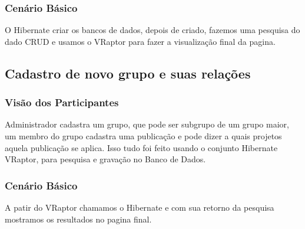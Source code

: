\documentclass[11pt, a4paper]{article}
\begin{document}
	        \subsubsection{Cenário Básico}
                O Hibernate criar os bancos de dados, depois de criado, fazemos uma pesquisa do dado CRUD e usamos o VRaptor para fazer a visualização final da pagina.
					
             
        \subsection{Cadastro de novo grupo e suas relações}
		
	        \subsubsection{Visão dos Participantes}
                Administrador cadastra um grupo, que pode ser subgrupo de um grupo maior, um membro do grupo cadastra uma publicação e pode dizer a quais projetos aquela publicação se aplica. Isso tudo foi feito usando o conjunto Hibernate VRaptor, para pesquisa e gravação no Banco de Dados.

	        \subsubsection{Cenário Básico}
                A patir do VRaptor chamamos o Hibernate e com sua retorno da pesquisa mostramos os resultados no pagina final.
\end{document}
